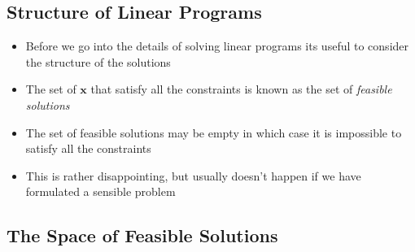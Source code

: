 \Outline %

\begin{slide}
\section{Structure of Linear Programs}

\begin{PauseHighLight}
  \begin{itemize}
  \item Before we go into the details of solving linear programs its
    useful to consider the structure of the solutions\pause
  \item The set of $\bm{x}$ that satisfy all the constraints is known as
    the set of \emph{feasible solutions}\pause
  \item The set of feasible solutions may be empty in which case it is
    impossible to satisfy all the constraints\pause
  \item This is rather disappointing, but usually doesn't happen if we
    have formulated a sensible problem\pause
  \end{itemize}
\end{PauseHighLight}

\end{slide}


\begin{slide}
\section{The Space of Feasible Solutions}

\pb
\pause {}
\begin{center}
  \pause
\end{center}
\end{slide}


